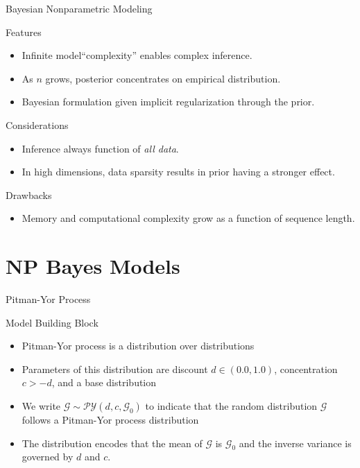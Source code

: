 \documentclass{beamer}
\newcommand{\G}{\mathcal{G}}
\newcommand{\PY}{\mathcal{P}\mathcal{Y}}
\begin{document}
\begin{frame}[t]{Bayesian Nonparametric Modeling}
	
	\begin{exampleblock}{Features}
		\begin{itemize}
			\item Infinite model``complexity'' enables complex inference.  
			\item As $n$ grows, posterior concentrates on empirical distribution.
			\item Bayesian formulation given implicit regularization through the prior.
		\end{itemize}
	\end{exampleblock}

	\begin{block}{Considerations}
		\begin{itemize}
			\item Inference always function of {\em all data}.
			\item In high dimensions, data sparsity results in prior having a stronger effect.
		\end{itemize}
	\end{block}
	
	\begin{alertblock}{Drawbacks}
		\begin{itemize}
			\item Memory and computational complexity grow as a function of sequence length.
		\end{itemize}
	\end{alertblock}
\end{frame}	

\section{NP Bayes Models}

\begin{frame}[t]{Pitman-Yor Process \cite{Pitman1997}}

	\begin{block}{Model Building Block}
		\begin{itemize}
			\item Pitman-Yor process is a distribution over distributions
			\item Parameters of this distribution are discount $d \in (0.0, 1.0)$, concentration $c  > -d$, and a base distribution
			\item We write $\G \sim \PY(d,c,\G_0)$ to indicate that the random distribution $\G$ follows a Pitman-Yor process distribution
			\item The distribution encodes that the mean of $\G$ is $\G_0$ and the inverse variance is governed by $d$ and $c$.
		\end{itemize}
	\end{block}
	
	\end{frame}
	
\end{document}

